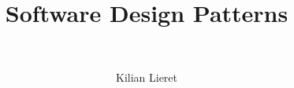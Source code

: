 %
\title{Software Design Patterns}
\subtitle{\ \relax}
\author{Kilian Lieret}
\newcommand*{\coauthors}{}
%
%
%